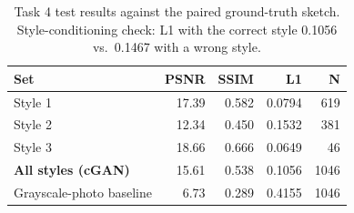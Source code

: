 \begin{table}[t]
\centering
\caption{Task 4 test results against the paired ground-truth sketch. Style-conditioning check: L1 with the correct style 0.1056 vs.\ 0.1467 with a wrong style.}
\label{tab:t4}
\footnotesize
\begin{tabular}{lrrrr}
\toprule
Set & PSNR & SSIM & L1 & N \\
\midrule
Style 1 & 17.39 & 0.582 & 0.0794 & 619 \\
Style 2 & 12.34 & 0.450 & 0.1532 & 381 \\
Style 3 & 18.66 & 0.666 & 0.0649 & 46 \\
\textbf{All styles (cGAN)} & 15.61 & 0.538 & 0.1056 & 1046 \\
Grayscale-photo baseline & 6.73 & 0.289 & 0.4155 & 1046 \\
\bottomrule
\end{tabular}
\end{table}
